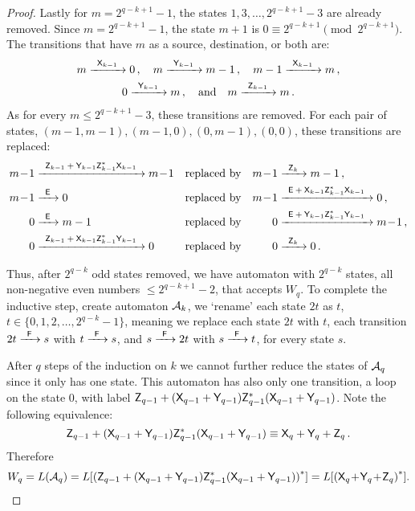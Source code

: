 \begin{proof}
    Lastly for $m = 2^{q-k+1}-1$,  the states $1, 3, \dotsc, 2^{q-k+1}-3$ are already removed. Since $m = 2^{q-k+1}-1$, the state $m+1$ is $0 \equiv 2^{q-k+1} \pmod{2^{q-k+1}}$. The transitions that have $m$ as a source, destination, or both are:
    \begin{multline*}
        m {\; \xrightarrow[]{\: \; {\mathsf{X}}_{k-1} \: \;} \;} 0 \, , \quad m {\; \xrightarrow[]{\: \; {\mathsf{Y}}_{k-1} \: \;} \;} m-1 \, , \quad m-1 {\; \xrightarrow[]{\: \; {\mathsf{X}}_{k-1} \: \;} \;} m \, , \\
        0 {\; \xrightarrow[]{\: \; {\mathsf{Y}}_{k-1} \: \;} \;} m \, , \quad \text{and} \quad m {\; \xrightarrow[]{\: \; {\mathsf{Z}}_{k-1} \: \;} \;} m \, .
    \end{multline*}
    As for every $m \leq 2^{q-k+1}-3$, these transitions are removed. For each pair of states, $(m-1,m-1), (m-1,0), (0,m-1), (0,0)$, these transitions are replaced:
    \begin{align*}
        m \! - \! 1 &\tr{\re{Z}_{k-1} \: + \: \re{Y}_{k-1}\re{Z}_{k-1}^*\re{X}_{k-1}} m \! - \! 1 & &\text{replaced by} & m \! - \! 1 &\tr{\re{Z}_k} m-1 \, , \\
        m \! - \! 1 &\tr{\re{E}} 0 & &\text{replaced by} & m \! - \! 1 &\tr{\re{E} \: + \: \re{X}_{k-1}\re{Z}_{k-1}^*\re{X}_{k-1}} 0 \, , \\
        0 &\tr{\re{E}} m-1 & &\text{replaced by} & 0 &\tr{\re{E} \: + \: \re{Y}_{k-1}\re{Z}_{k-1}^*\re{Y}_{k-1}} m \! - \! 1 \, , \\
        0 &\tr{\re{Z}_{k-1} \: + \: \re{X}_{k-1}\re{Z}_{k-1}^*\re{Y}_{k-1}} 0 & &\text{replaced by} & 0 &\tr{\re{Z}_k} 0 \, .
    \end{align*}

    Thus, after $2^{q-k}$ odd states removed, we have automaton with $2^{q-k}$ states, all non-negative even numbers $\leq 2^{q-k+1}-2$, that accepts $W_q$. To complete the inductive step, create automaton ${\mathcal{A}}_k$, we `rename' each state $2t$ as $t$, $t \in \{ 0, 1, 2, \dotsc, 2^{q-k}-1 \}$, meaning we replace each state $2t$ with $t$, each transition $2t {\; \xrightarrow[]{\: \; {\mathsf{F}} \: \;} \;} s$ with $t {\; \xrightarrow[]{\: \; {\mathsf{F}} \: \;} \;} s$, and $s {\; \xrightarrow[]{\: \; {\mathsf{F}} \: \;} \;} 2t$ with $s {\; \xrightarrow[]{\: \; {\mathsf{F}} \: \;} \;} t$, for every state $s$.

    After $q$ steps of the induction on $k$ we cannot further reduce the states of ${\mathcal{A}}_q$ since it only has one state. This automaton has also only one transition, a loop on the state $0$, with label ${\mathsf{Z}}_{q-1} + ({\mathsf{X}}_{q-1} + {\mathsf{Y}}_{q-1}){\mathsf{Z}}_{q-1}^*({\mathsf{X}}_{q-1} + {\mathsf{Y}}_{q-1})$. Note the following equivalence:
    \[
        {\mathsf{Z}}_{q-1} + ({\mathsf{X}}_{q-1} + {\mathsf{Y}}_{q-1}){\mathsf{Z}}_{q-1}^*({\mathsf{X}}_{q-1} + {\mathsf{Y}}_{q-1}) \equiv {\mathsf{X}}_q + {\mathsf{Y}}_q + {\mathsf{Z}}_q \, . \\
    \]
    Therefore
    \[
        W_q = L({\mathcal{A}}_q) = L[{({\mathsf{Z}}_{q-1} + ({\mathsf{X}}_{q-1} + {\mathsf{Y}}_{q-1}){\mathsf{Z}}_{q-1}^*({\mathsf{X}}_{q-1} + {\mathsf{Y}}_{q-1}))}^*] = L[{({\mathsf{X}}_q \! + \! {\mathsf{Y}}_q \! + \! {\mathsf{Z}}_q)}^*].
    \]


\end{proof}
